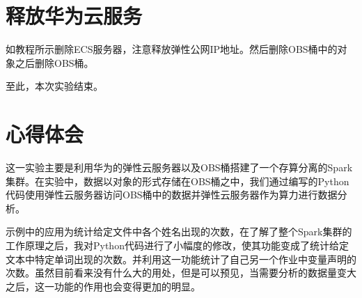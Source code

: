 \documentclass{../source/zjureport}
\begin{document}
    \section{释放华为云服务}
        如教程所示删除ECS服务器，注意释放弹性公网IP地址。然后删除OBS桶中的对象之后删除OBS桶。

        至此，本次实验结束。

    \section{心得体会}
    这一实验主要是利用华为的弹性云服务器以及OBS桶搭建了一个存算分离的Spark集群。在实验中，数据以对象的形式存储在OBS桶之中，我们通过编写的Python代码使用弹性云服务器访问OBS桶中的数据并弹性云服务器作为算力进行数据分析。
    
    示例中的应用为统计给定文件中各个姓名出现的次数，在了解了整个Spark集群的工作原理之后，我对Python代码进行了小幅度的修改，使其功能变成了统计给定文本中特定单词出现的次数。并利用这一功能统计了自己另一个作业中变量声明的次数。虽然目前看来没有什么大的用处，但是可以预见，当需要分析的数据量变大之后，这一功能的作用也会变得更加的明显。
\end{document}
